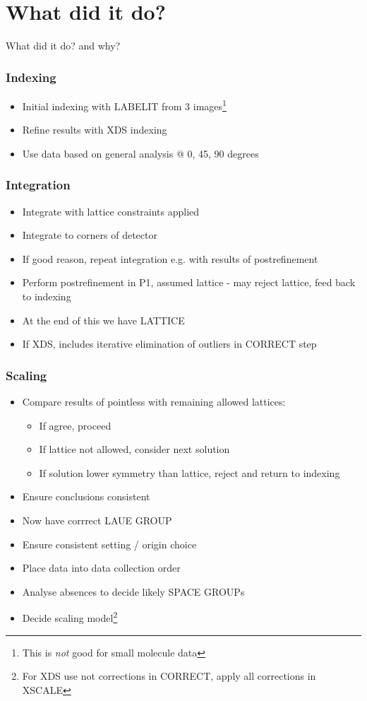 \documentclass[slides,compress]{beamer}
\begin{document}
\section{What did it do?}

\begin{frame}
\begin{center}
\Huge What did it do? and why?
\end{center}
\end{frame}

\begin{frame}
\frametitle{Indexing}
\begin{itemize}
\item{Initial indexing with LABELIT from 3 images\footnote{This is \emph{not}
good for small molecule data}}
\item{Refine results with XDS indexing}
\item{Use data based on general analysis @ 0, 45, 90 degrees}
\end{itemize}
\end{frame}

\begin{frame}
\frametitle{Integration}
\begin{itemize}
\item{Integrate with lattice constraints applied}
\item{Integrate to corners of detector}
\item{If good reason, repeat integration e.g. with results of postrefinement}
\item{Perform postrefinement in P1, assumed lattice - may reject lattice,
feed back to indexing}
\item{At the end of this we have LATTICE}
\item{If XDS, includes iterative elimination of outliers in CORRECT step}
\end{itemize}
\end{frame}

\begin{frame}
\frametitle{Scaling}
\begin{itemize}
\item{Compare results of pointless with remaining allowed lattices:
\begin{itemize}
\item{If agree, proceed}
\item{If lattice not allowed, consider next solution}
\item{If solution lower symmetry than lattice, reject and return to indexing}
\end{itemize}
}
\item{Ensure conclusions consistent}
\item{Now have corrrect LAUE GROUP}
\item{Ensure consistent setting / origin choice}
\item{Place data into data collection order}
\item{Analyse absences to decide likely SPACE GROUPs}
\item{Decide scaling model\footnote{For XDS use not corrections in CORRECT,
apply all corrections in XSCALE}}
\end{itemize}
\end{frame}
\end{document}
